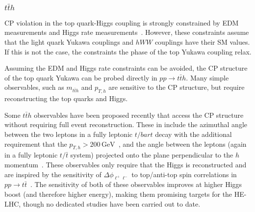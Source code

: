 \documentclass[../report.tex]{subfiles}
\begin{document}
\subsubsection{$t\bar{t} h$}

CP violation in the top quark-Higgs coupling is strongly constrained by EDM measurements and Higgs rate measurements~\cite{Brod:2013cka}. However, these constraints assume that the light quark Yukawa couplings and $hWW$ couplings have their SM values. If this is not the case, the constraints the phase of the top Yukawa coupling relax.
    
Assuming the EDM and Higgs rate  constraints can be avoided, the CP structure of the top quark Yukawa can be probed directly in $pp \to t\bar t h$. Many simple observables, such as $m_{t\bar t h}$ and $p_{T,h}$ are sensitive to the CP structure, but require reconstructing the top quarks and Higgs.

Some $t\bar t h$ observables have been proposed recently that access the CP structure without requiring full event reconstruction. These in include the azimuthal angle between the two leptons in a fully leptonic $t/bar{t}$ decay with the additional requirement that the $p_{T,h} > 200\, \text{GeV}$~\cite{Buckley:2015vsa}, and the angle between the leptons (again in a fully leptonic $t/\bar t$ system) projected onto the plane perpendicular to the $h$ momentum~\cite{Boudjema:2015nda}. These observables only require that the Higgs is reconstructed and are inspired by the sensitivity of $\Delta \phi_{\ell^+\ell^-}$ to top/anti-top spin correlations in $pp \to t\bar t$~\cite{Mahlon:1995zn}. The sensitivity of both of these observables improves at higher Higgs boost (and therefore higher energy), making them promising targets for the HE-LHC, though no dedicated studies have been carried out to date.
\end{document}
